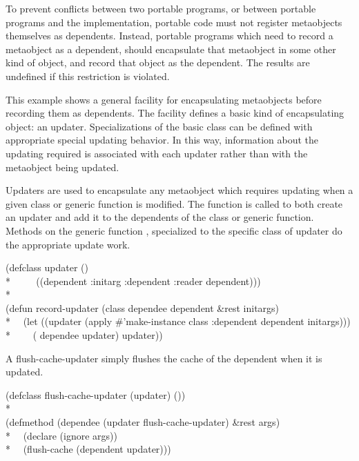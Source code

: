 To prevent conflicts between two portable programs, or between portable programs
and the implementation, portable code must not register metaobjects themselves
as dependents. Instead, portable programs which need to record a metaobject as a
dependent, should encapsulate that metaobject in some other kind of object, and
record that object as the dependent. The results are undefined if this
restriction is violated. 

This example shows a general facility for encapsulating metaobjects before
recording them as dependents. The facility defines a basic kind of encapsulating
object: an updater. Specializations of the basic class can be defined with
appropriate special updating behavior. In this way, information about the
updating required is associated with each updater rather than with the
metaobject being updated. 

Updaters are used to encapsulate any metaobject which requires updating when a
given class or generic function is modified. The function  is
called to both create an updater and add it to the dependents of the class or
generic function. Methods on the generic function , specialized
to the specific class of updater do the appropriate update work. 

\begin{lisp}
(defclass updater ()\\*
~~~~ ((dependent :initarg :dependent :reader dependent)))\\*
\\
(defun record-updater (class dependee dependent \&rest initargs)\\*
~~(let ((updater (apply \#'make-instance class :dependent dependent initargs)))\\*
~~~~( dependee updater) updater))
\end{lisp}
  
A flush-cache-updater simply flushes the cache of the dependent when it is updated.

\begin{lisp}
(defclass flush-cache-updater (updater) ()) \\*
\\
(defmethod  (dependee (updater flush-cache-updater) \&rest
args) \\*
~~(declare (ignore args)) \\*
~~(flush-cache (dependent updater)))
\end{lisp}

